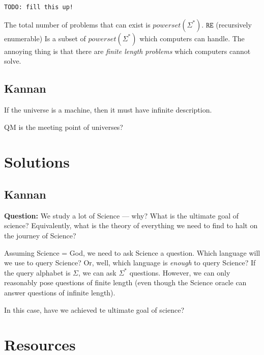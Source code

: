 \texttt{TODO: fill this up!}

The total number of problems that can exist is $powerset(\Sigma^*)$.
$\texttt{RE}$ (recursively enumerable) Is a subset of $powerset(\Sigma^*)$
which computers can handle. The annoying thing is that there are \textit{finite
length problems} which computers cannot solve.

\subsection{Kannan}
If the universe is a machine, then it must have infinite description.

QM is the meeting point of universes?

\section{Solutions}

\subsection{Kannan}
\textbf{Question:} We study a lot of Science --- why? What is the ultimate goal
of science? Equivalently, what is the theory of everything we need to find
to halt on the journey of Science?

Assuming Science = God, we need to ask Science a question. Which language
will we use to query Science? Or, well, which language is \textit{enough} to
query Science? If the query alphabet is $\Sigma$, we can ask $\Sigma^*$ questions.
However, we can only reasonably pose questions of finite length (even though the
Science oracle can answer questions of infinite length).

In this case, have we achieved te ultimate goal of science?

\section{Resources}
